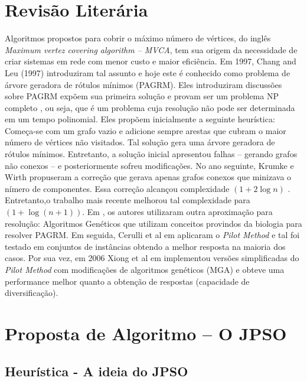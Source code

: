 \documentclass{sig-alternate-05-2015}
\begin{document}
\section{Revisão Literária} \label{sec2}
Algoritmos propostos para cobrir o máximo número de vértices, do inglês \textit{Maximum vertez covering algorithm -- MVCA}, tem sua origem da necessidade de
criar sistemas em rede com menor custo e maior eficiência. Em 1997, Chang and Leu (1997) \cite{chang1997minimum} introduziram tal assunto e hoje este é conhecido
como problema de árvore geradora de rótulos mínimos (PAGRM).
Eles introduziram discussões sobre PAGRM expõem  sua primeira solução e provam ser um problema NP completo \cite{Ladner:1975:SPT:321864.321877}, ou seja, que
é um problema cuja resolução não pode ser determinada em um tempo polinomial. Eles propõem inicialmente a seguinte heurística: Começa-se com um grafo vazio e adicione
sempre arestas que cubram o maior número de vértices não visitados. Tal solução gera uma árvore geradora de rótulos mínimos. Entretanto, a solução inicial
apresentou falhas -- gerando grafos não conexos -- e posteriormente sofreu modificações.
No ano seguinte, Krumke e Wirth \cite{krumke1998minimum} propuseram a correção que gerava apenas grafos conexos que minizava o nímero de componentes. Essa correção
alcançou complexidade $(1 + 2 \log{n})$ . Entretanto,o trabalho mais recente \cite{wan2002note} melhorou tal complexidade para $ ( 1 + \log {(n + 1)}) $.
Em \cite{xiong2005one}, os autores utilizaram outra aproximação para resolução:
Algoritmos Genéticos que utilizam conceitos provindos da biologia para resolver
PAGRM. Em seguida, Cerulli et al em \cite{cerulli2005metaheuristics} aplicaram o \textit{Pilot Method} e tal foi testado em conjuntos de instâncias obtendo a melhor
resposta na maioria dos casos. Por sua vez, em 2006 Xiong et al em \cite{xiong2006improved} implementou versões simplificadas do \textit{Pilot Method} com modificações
de algoritmos genéticos (MGA) e obteve uma performance melhor quanto a obtenção de respostas (capacidade de diversificação).

\section{Proposta de Algoritmo -- O JPSO} \label{sec3}

\subsection{Heurística - A ideia do JPSO}
\end{document}
